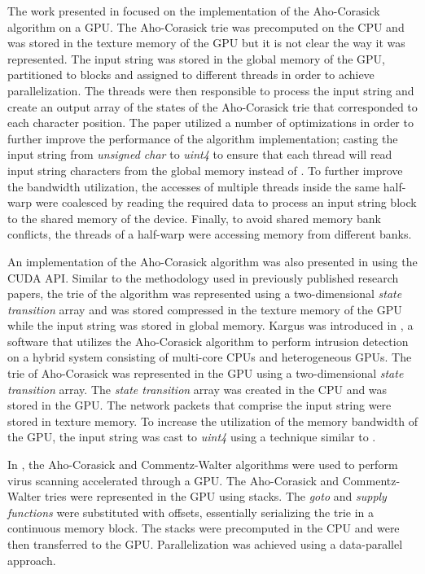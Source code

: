 \documentclass{ws-ijait}
\begin{document}
The work presented in \cite{Zha2011} focused on the implementation of the Aho-Corasick algorithm on a GPU. The Aho-Corasick trie was precomputed on the CPU and was stored in the texture memory of the GPU but it is not clear the way it was represented. The input string was stored in the global memory of the GPU, partitioned to blocks and assigned to different threads in order to achieve parallelization. The threads were then responsible to process the input string and create an output array of the states of the Aho-Corasick trie that corresponded to each character position. The paper utilized a number of optimizations in order to further improve the performance of the algorithm implementation; casting the input string from \textit{unsigned char} to \textit{uint4} to ensure that each thread will read  input string characters from the global memory instead of . To further improve the bandwidth utilization, the accesses of multiple threads inside the same half-warp were coalesced by reading the required data to process an input string block to the shared memory of the device. Finally, to avoid shared memory bank conflicts, the threads of a half-warp were accessing memory from different banks.

An implementation of the Aho-Corasick algorithm was also presented in \cite{Hu2012} using the CUDA API. Similar to the methodology used in previously published research papers, the trie of the algorithm was represented using a two-dimensional \textit{state transition} array and was stored compressed in the texture memory of the GPU while the input string was stored in global memory. Kargus was introduced in \cite{Jamshed2012}, a software that utilizes the Aho-Corasick algorithm to perform intrusion detection on a hybrid system consisting of multi-core CPUs and heterogeneous GPUs. The trie of Aho-Corasick was represented in the GPU using a two-dimensional \textit{state transition} array. The \textit{state transition} array was created in the CPU and was stored in the GPU. The network packets that comprise the input string were stored in texture memory. To increase the utilization of the memory bandwidth of the GPU, the input string was cast to \textit{uint4} using a technique similar to \cite{Zha2011}.

In \cite{Pungila2012}, the Aho-Corasick and Commentz-Walter algorithms were used to perform virus scanning accelerated through a GPU. The Aho-Corasick and Commentz-Walter tries were represented in the GPU using stacks. The \textit{goto} and \textit{supply functions} were substituted with offsets, essentially serializing the trie in a continuous memory block. The stacks were precomputed in the CPU and were then transferred to the GPU. Parallelization was achieved using a data-parallel approach.
\end{document}
